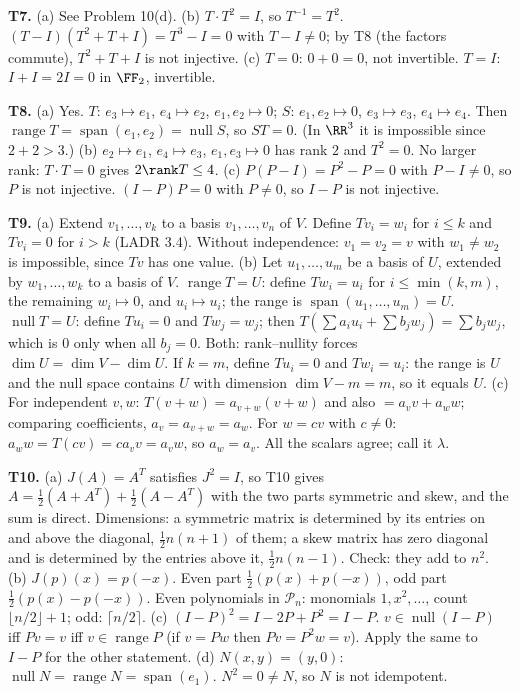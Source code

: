 \documentclass[11pt]{scrartcl}
\DeclareMathOperator{\nul}{null}
\DeclareMathOperator{\range}{range}
\DeclareMathOperator{\spn}{span}
\newcommand{\PP}{\mathcal P}
\begin{document}
\textbf{T7.}
(a) See Problem 10(d).
(b) $T\cdot T^2=I$, so $T^{-1}=T^2$. $(T-I)(T^2+T+I)=T^3-I=0$ with $T-I\ne0$; by T8 (the factors commute), $T^2+T+I$ is not injective.
(c) $T=0$: $0+0=0$, not invertible. $T=I$: $I+I=2I=0$ in $\FF_2$, invertible.

\textbf{T8.}
(a) Yes. $T$: $e_3\mapsto e_1$, $e_4\mapsto e_2$, $e_1,e_2\mapsto0$; $S$: $e_1,e_2\mapsto0$, $e_3\mapsto e_3$, $e_4\mapsto e_4$. Then $\range T=\spn(e_1,e_2)=\nul S$, so $ST=0$. (In $\RR^3$ it is impossible since $2+2>3$.)
(b) $e_2\mapsto e_1$, $e_4\mapsto e_3$, $e_1,e_3\mapsto0$ has rank $2$ and $T^2=0$. No larger rank: $T\cdot T=0$ gives $2\rank T\le4$.
(c) $P(P-I)=P^2-P=0$ with $P-I\ne0$, so $P$ is not injective. $(I-P)P=0$ with $P\ne0$, so $I-P$ is not injective.

\textbf{T9.}
(a) Extend $v_1,\dots,v_k$ to a basis $v_1,\dots,v_n$ of $V$. Define $Tv_i=w_i$ for $i\le k$ and $Tv_i=0$ for $i>k$ (LADR 3.4). Without independence: $v_1=v_2=v$ with $w_1\ne w_2$ is impossible, since $Tv$ has one value.
(b) Let $u_1,\dots,u_m$ be a basis of $U$, extended by $w_1,\dots,w_k$ to a basis of $V$.
$\range T=U$: define $Tw_i=u_i$ for $i\le\min(k,m)$, the remaining $w_i\mapsto0$, and $u_i\mapsto u_i$; the range is $\spn(u_1,\dots,u_m)=U$.
$\nul T=U$: define $Tu_i=0$ and $Tw_j=w_j$; then $T(\sum a_iu_i+\sum b_jw_j)=\sum b_jw_j$, which is $0$ only when all $b_j=0$.
Both: rank--nullity forces $\dim U=\dim V-\dim U$. If $k=m$, define $Tu_i=0$ and $Tw_i=u_i$: the range is $U$ and the null space contains $U$ with dimension $\dim V-m=m$, so it equals $U$.
(c) For independent $v,w$: $T(v+w)=a_{v+w}(v+w)$ and also $=a_vv+a_ww$; comparing coefficients, $a_v=a_{v+w}=a_w$. For $w=cv$ with $c\ne0$: $a_ww=T(cv)=ca_vv=a_vw$, so $a_w=a_v$. All the scalars agree; call it $\lambda$.

\textbf{T10.}
(a) $J(A)=A^T$ satisfies $J^2=I$, so T10 gives $A=\tfrac12(A+A^T)+\tfrac12(A-A^T)$ with the two parts symmetric and skew, and the sum is direct. Dimensions: a symmetric matrix is determined by its entries on and above the diagonal, $\tfrac12n(n+1)$ of them; a skew matrix has zero diagonal and is determined by the entries above it, $\tfrac12n(n-1)$. Check: they add to $n^2$.
(b) $J(p)(x)=p(-x)$. Even part $\tfrac12(p(x)+p(-x))$, odd part $\tfrac12(p(x)-p(-x))$. Even polynomials in $\PP_n$: monomials $1,x^2,\dots$, count $\lfloor n/2\rfloor+1$; odd: $\lceil n/2\rceil$.
(c) $(I-P)^2=I-2P+P^2=I-P$. $v\in\nul(I-P)$ iff $Pv=v$ iff $v\in\range P$ (if $v=Pw$ then $Pv=P^2w=v$). Apply the same to $I-P$ for the other statement.
(d) $N(x,y)=(y,0)$: $\nul N=\range N=\spn(e_1)$. $N^2=0\ne N$, so $N$ is not idempotent.
\end{document}
